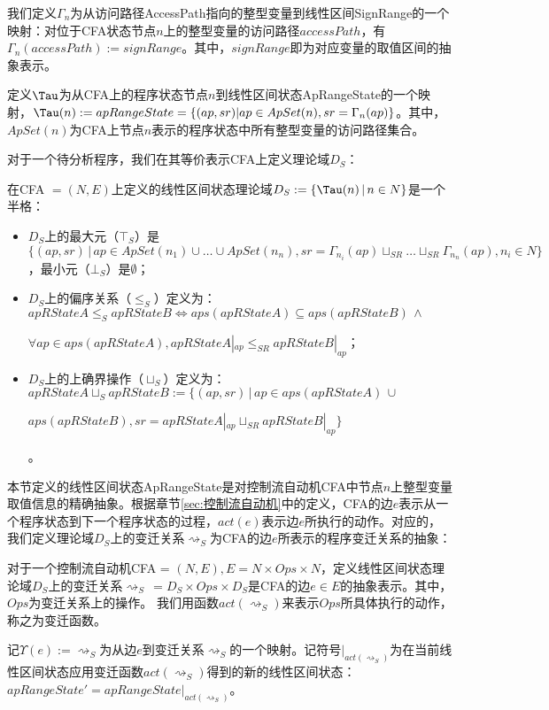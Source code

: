我们定义$ \Gamma_n $为从访问路径AccessPath指向的整型变量到线性区间SignRange的一个映射：对位于CFA状态节点$ n $上的整型变量的访问路径$ accessPath $，有$ \Gamma_n(accessPath) := signRange $。其中，$ signRange $即为对应变量的取值区间的抽象表示。

定义$ \Tau $为从CFA上的程序状态节点$ n $到线性区间状态ApRangeState的一个映射，$ \Tau(n) := apRangeState = \{(ap, sr) | ap \in ApSet(n), sr = \Gamma_n(ap)\} $。其中，$ ApSet(n) $为CFA上节点$ n $表示的程序状态中所有整型变量的访问路径集合。

对于一个待分析程序，我们在其等价表示CFA上定义理论域$ D_{S} $：

\begin{definition}
	在CFA $  = (N, E) $上定义的线性区间状态理论域$ D_S  := \{\Tau(n) \, | \, n \in N  \}  $是一个半格：
	\begin{itemize}
		\item $ D_S $上的最大元（$ \top_S $）是$ \{(ap, sr) \, | \, ap \in ApSet(n_1) \cup \dots \cup ApSet(n_n), sr = \Gamma_{n_i}(ap) \sqcup_{SR} \dots \sqcup_{SR} \Gamma_{n_n}(ap), n_i \in N \} $，最小元（$ \bot_S $）是$ \emptyset $；
		
		\item $ D_S $上的偏序关系（$ \le_S $）定义为：\\
		$ apRStateA \le_S apRStateB \iff aps(apRStateA) \subseteq aps(apRStateB) \, \land $ \\
		\centerline{$ \forall ap \in aps(apRStateA), apRStateA |_{ap} \le_{SR} apRStateB |_{ap} $；}
		
		\item $ D_S $上的上确界操作（$ \sqcup_S $）定义为：\\
		$ apRStateA \sqcup_S apRStateB :=  \{(ap, sr) \, | \, ap \in aps(apRStateA) \,\cup $\\
		\centerline{$ aps( apRStateB), sr = apRStateA |_{ap} \sqcup_{SR} apRStateB |_{ap} \} $}。
	\end{itemize}
\end{definition}

本节定义的线性区间状态ApRangeState是对控制流自动机CFA中节点$ n $上整型变量取值信息的精确抽象。根据章节\ref{sec:控制流自动机}中的定义，CFA的边$ e $表示从一个程序状态到下一个程序状态的过程，$ act(e) $表示边$ e $所执行的动作。对应的，我们定义理论域$ D_S $上的变迁关系$ \rightsquigarrow_S $为CFA的边$ e $所表示的程序变迁关系的抽象：
\begin{definition}
	对于一个控制流自动机CFA = $ (N, E) , E = N \times Ops \times N$，定义线性区间状态理论域$ D_S $上的变迁关系$ \rightsquigarrow_S \, = D_S \times Ops \times D_S $是CFA的边$ e \in E $的抽象表示。其中，$ Ops $为变迁关系上的操作。	我们用函数$ act(\rightsquigarrow_S) $来表示$ Ops $所具体执行的动作，称之为变迁函数。
	
	记$ \Upsilon(e) := \rightsquigarrow_S $为从边$ e $到变迁关系$ \rightsquigarrow_S $的一个映射。记符号$ |_{act(\rightsquigarrow_S)} $为在当前线性区间状态应用变迁函数$ act(\rightsquigarrow_S) $得到的新的线性区间状态：$ apRangeState' = apRangeState |_{act(\rightsquigarrow_S)}$。
\end{definition}

